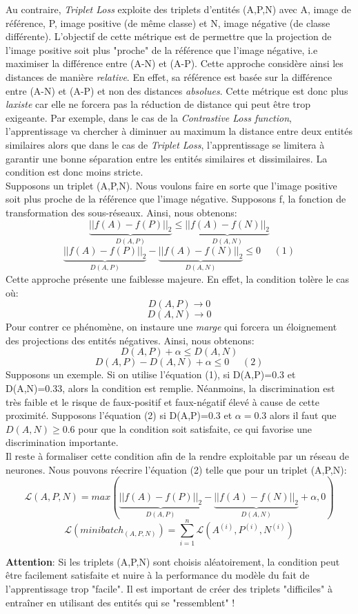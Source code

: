 \noindent Au contraire, \textit{Triplet Loss} exploite des triplets d'entités (A,P,N) avec A, image de référence, P, image positive (de même classe) et N, image négative (de classe différente). L'objectif de cette métrique est de permettre que la projection de l'image positive soit plus "proche" de la référence que l'image négative, i.e maximiser la différence entre (A-N) et (A-P). Cette approche considère ainsi les distances de manière \textit{relative}. En effet, sa référence est basée sur la différence entre (A-N) et (A-P) et non des distances \textit{absolues}. Cette métrique est donc plus \textit{laxiste} car elle ne forcera pas la réduction de distance qui peut être trop exigeante. Par exemple, dans le cas de la \textit{Contrastive Loss function}, l'apprentissage va chercher à diminuer au maximum la distance entre deux entités similaires alors que dans le cas de \textit{Triplet Loss}, l'apprentissage se limitera à garantir une bonne séparation entre les entités similaires et dissimilaires. La condition est donc moins stricte.\\

\noindent Supposons un triplet (A,P,N). Nous voulons faire en sorte que l'image positive soit plus proche de la référence que l'image négative. Supposons f, la fonction de transformation des sous-réseaux. Ainsi, nous obtenons:
$$\underbrace{||f(A)-f(P)||_2}_{D(A,P)} \leq \underbrace{||f(A)-f(N)||_2}_{D(A,N)}$$
$$\underbrace{||f(A)-f(P)||_2}_{D(A,P)} - \underbrace{||f(A)-f(N)||_2}_{D(A,N)}\leq 0 \ \ \ \ \ \ (1)$$
\noindent Cette approche présente une faiblesse majeure. En effet, la condition tolère le cas où:
$$D(A,P) \longrightarrow 0$$
$$D(A,N) \longrightarrow 0$$
\noindent Pour contrer ce phénomène, on instaure une \textit{marge} qui forcera un éloignement des projections des entités négatives. Ainsi, nous obtenons:
$$D(A,P) + \alpha \leq D(A,N)$$
$$D(A,P) - D(A,N) + \alpha \leq 0\ \ \ \ \ \ (2)$$
\noindent Supposons un exemple. Si on utilise l'équation (1), si D(A,P)=0.3 et D(A,N)=0.33, alors la condition est remplie. Néanmoins, la discrimination est très faible et le risque de faux-positif et faux-négatif élevé à cause de cette proximité. Supposons l'équation (2) si D(A,P)=0.3 et $\alpha=0.3$ alors il faut que $D(A,N) \geq 0.6$ pour que la condition soit satisfaite, ce qui favorise une discrimination importante.\\

\noindent Il reste à formaliser cette condition afin de la rendre exploitable par un réseau de neurones. Nous pouvons réecrire l'équation (2) telle que pour un triplet (A,P,N):
$$\mathcal{L}(A,P,N)=max(\underbrace{||f(A)-f(P)||_2}_{D(A,P)} - \underbrace{||f(A)-f(N)||_2}_{D(A,N)}+\alpha,0) $$
$$\mathcal{L}(minibatch_{(A,P,N)})=\sum_{i=1}^n \mathcal{L}(A^{(i)},P^{(i)},N^{(i)})$$

\noindent \textbf{Attention}: Si les triplets (A,P,N) sont choisis aléatoirement, la condition peut être facilement satisfaite et nuire à la performance du modèle du fait de l'apprentissage trop "facile". Il est important de créer des triplets "difficiles" à entraîner en utilisant des entités qui se "ressemblent" !
